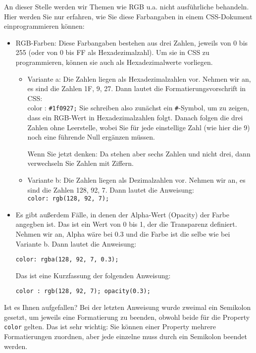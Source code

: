 An dieser Stelle werden wir Themen wie RGB u.a. nicht ausführliche behandeln. Hier werden Sie nur erfahren, wie Sie diese Farbangaben in einem CSS-Dokument einprogrammieren können:
\begin{itemize}
	\item RGB-Farben: Diese Farbangaben bestehen aus drei Zahlen, jeweils von 0 bis 255 (oder von 0 bis FF als Hexadezimalzahl). Um sie in CSS zu programmieren, können sie auch als Hexadezimalwerte vorliegen.

	\begin{itemize}
		\item Variante a: Die Zahlen liegen als Hexadezimalzahlen vor. Nehmen wir an, es sind die Zahlen 1F, 9, 27. Dann lautet die Formatierungsvorschrift in CSS:\\
		color : \verb|#1f0927;|
		Sie schreiben also zunächst ein \verb|#|-Symbol, um zu zeigen, dass ein RGB-Wert in Hexadezimalzahlen folgt. Danach folgen die drei Zahlen ohne Leerstelle, wobei Sie für jede einstellige Zahl (wie hier die 9) noch eine führende Null ergänzen müssen.
		
		Wenn Sie jetzt denken: Da stehen aber sechs Zahlen und nicht drei, dann verwechseln Sie Zahlen mit Ziffern.
		
		\item Variante b: Die Zahlen liegen als Dezimalzahlen vor. Nehmen wir an, es sind die Zahlen 128, 92, 7. Dann lautet die Anweisung:\\
		\verb|color: rgb(128, 92, 7);|
	\end{itemize}
	\item Es gibt außerdem Fälle, in denen der Alpha-Wert (Opacity) der Farbe angegben ist. Das ist ein Wert von 0 bis 1, der die Transparenz definiert. Nehmen wir an, Alpha wäre bei 0.3 und die Farbe ist die selbe wie bei Variante b. Dann lautet die Anweisung:

	\verb|color: rgba(128, 92, 7, 0.3);|

	Das ist eine Kurzfassung der folgenden Anweisung:
	
	\verb|color : rgb(128, 92, 7); opacity(0.3); |
\end{itemize}

Ist es Ihnen aufgefallen? Bei der letzten Anweisung wurde zweimal ein Semikolon gesetzt, um jeweils eine Formatierung zu beenden, obwohl beide für die Property \verb|color| gelten. Das ist sehr wichtig: Sie können einer Property mehrere Formatierungen zuordnen, aber jede einzelne muss durch ein Semikolon beendet werden.\\

